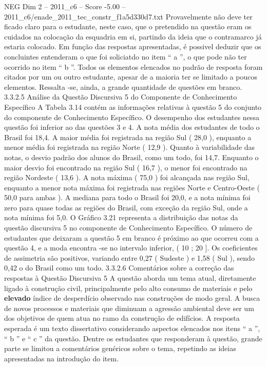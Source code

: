 \begin{textsample}{NEG Dim 2 – 2011\_c6 – Score -5.00 – 2011\_c6/enade\_2011\_tec\_constr\_f1a5d330d7.txt}
Provavelmente não deve ter ficado claro para o estudante, neste caso, que o pretendido na questão eram os cuidados na colocação da esquadria em si, partindo da ideia que o contramarco já estaria colocado.
Em função das respostas apresentadas, é possivel deduzir que os concluintes entenderam o que foi soliciatdo no item “ a ”, o que pode não ter ocorrido no item “ b ”.
Todos os elementos elencados no padrão de resposta foram citados por um ou outro estudante, apesar de a maioria ter se limitado a poucos elementos.
Ressalta -se, ainda, a grande quantidade de questões em branco. 3.3.2.5 Análise da Questão Discursiva 5 do Componente de Conhecimento Específico A Tabela 3.14 contém as informações relativas à questão 5 do conjunto do componente de Conhecimento Específico.
O desempenho dos estudantes nessa questão foi inferior ao das questões 3 e 4.
A nota média dos estudantes de todo o Brasil foi 18,4.
A maior média foi registrada na região Sul ( 28,0 ), enquanto a menor média foi registrada na região Norte ( 12,9 ).
Quanto à variabilidade das notas, o desvio padrão dos alunos do Brasil, como um todo, foi 14,7.
Enquanto o maior desvio foi encontrado na região Sul ( 16,7 ), o menor foi encontrado na região Nordeste ( 13,6 ).
A nota máxima ( 75,0 ) foi alcançada nas região Sul, enquanto a menor nota máxima foi registrada nas regiões Norte e Centro-Oeste ( 50,0 para ambas ).
A mediana para todo o Brasil foi 20,0, e a nota mínima foi zero para quase todas as regiões do Brasil, com exceção da região Sul, onde a nota mínima foi 5,0.
O Gráfico 3.21 representa a distribuição das notas da questão discursiva 5 no componente de Conhecimento Específico.
O número de estudantes que deixaram a questão 5 em branco é próximo ao que ocorreu com a questão 4, e a moda encontra -se no intervalo inferior, ( 10 ; 20 ].
Os coeficientes de assimetria são positivos, variando entre 0,27 ( Sudeste ) e 1,58 ( Sul ), sendo 0,42 o do Brasil como um todo. 3.3.2.6 Comentários sobre a correção das respostas à Questão Discursiva 5 A questão aborda um tema atual, diretamente ligado à construção civil, principalmente pelo alto consumo de materiais e pelo \textbf{elevado} índice de desperdício observado nas construções de modo geral.
A busca de novos processos e materiais que diminuam a agressão ambiental deve ser um dos objetivos de quem atua no ramo da construção de edifícios.
A resposta esperada é um texto dissertativo considerando aspectos elencados nos itens “ a ”, “ b ” e “ c ” da questão.
Dentre os estudantes que responderam à questão, grande parte se limitou a comentários genéricos sobre o tema, repetindo as ideias apresentadas na introdução do item.

\end{textsample}
